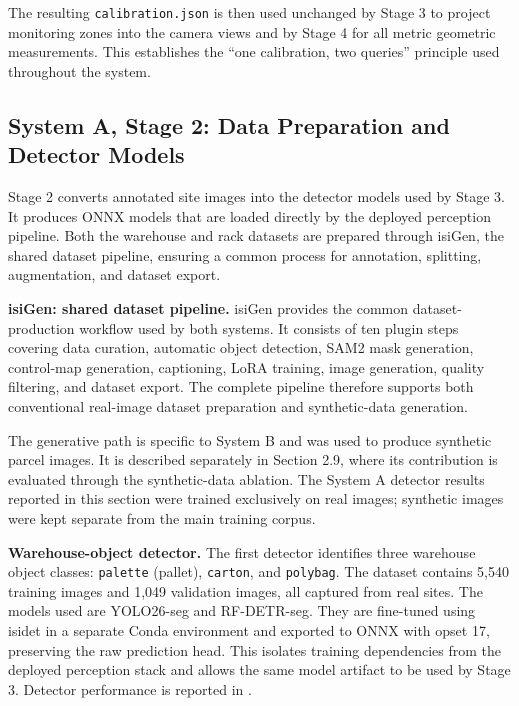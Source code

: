 \documentclass[9pt,a4paper,twocolumn]{rho-class/rho}
\begin{document}
The resulting \texttt{calibration.json} is then used unchanged by Stage 3 to project monitoring zones into the camera views and by Stage 4 for all metric geometric measurements. This establishes the ``one calibration, two queries'' principle used throughout the system.

\subsection{System A, Stage 2: Data Preparation and Detector Models}

Stage 2 converts annotated site images into the detector models used by Stage 3. It produces ONNX models that are loaded directly by the deployed perception pipeline. Both the warehouse and rack datasets are prepared through isiGen, the shared dataset pipeline, ensuring a common process for annotation, splitting, augmentation, and dataset export.

\textbf{isiGen: shared dataset pipeline.} isiGen provides the common dataset-production workflow used by both systems. It consists of ten plugin steps covering data curation, automatic object detection, SAM2 mask generation, control-map generation, captioning, LoRA training, image generation, quality filtering, and dataset export. The complete pipeline therefore supports both conventional real-image dataset preparation and synthetic-data generation.

The generative path is specific to System B and was used to produce synthetic parcel images. It is described separately in Section 2.9, where its contribution is evaluated through the synthetic-data ablation. The System A detector results reported in this section were trained exclusively on real images; synthetic images were kept separate from the main training corpus.

\textbf{Warehouse-object detector.} The first detector identifies three warehouse object classes: \texttt{palette} (pallet), \texttt{carton}, and \texttt{polybag}. The dataset contains 5{,}540 training images and 1{,}049 validation images, all captured from real sites. The models used are YOLO26-seg and RF-DETR-seg. They are fine-tuned using isidet in a separate Conda environment and exported to ONNX with opset 17, preserving the raw prediction head. This isolates training dependencies from the deployed perception stack and allows the same model artifact to be used by Stage 3. Detector performance is reported in .
\end{document}
